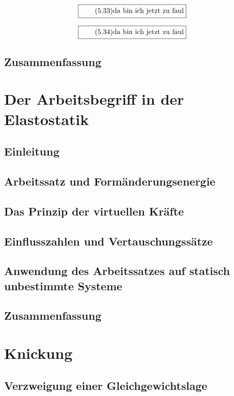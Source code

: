 \documentclass[11pt]{article}
\newcommand{\1}{ {\mathds{1}} }
\begin{document}
		\begin{equation}
			\boxed{
				\tag{5.33}
				\begin{split}
					\text{da bin ich jetzt zu faul}
				\end{split}
			}
		\end{equation}

		\begin{equation}
			\boxed{
				\tag{5.34}
				\begin{split}
					\text{da bin ich jetzt zu faul}
				\end{split}
			}
		\end{equation}
		
		\subsection{Zusammenfassung}	

		\section{Der Arbeitsbegriff in der Elastostatik}
		\subsection{Einleitung}
		\subsection{Arbeitssatz und Formänderungsenergie}
		\subsection{Das Prinzip der virtuellen Kräfte}
		\subsection{Einflusszahlen und Vertauschungssätze}
		\subsection{Anwendung des Arbeitssatzes auf statisch unbestimmte Systeme}
		\subsection{Zusammenfassung}

		\section{Knickung}
		\subsection{Verzweigung einer Gleichgewichtslage}
\end{document}

